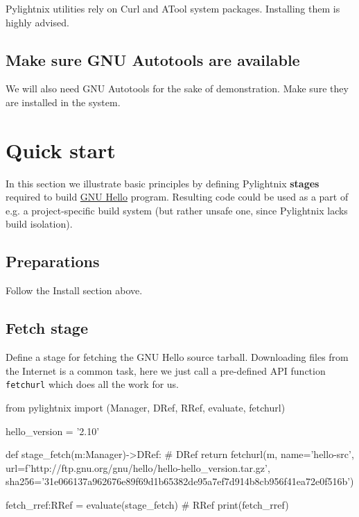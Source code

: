 \documentclass{article}
\begin{document}
Pylightnix utilities rely on Curl and ATool system packages. Installing them
is highly advised.


\subsection{Make sure GNU Autotools are available}

We will also need GNU Autotools for the sake of demonstration. Make sure they
are installed in the system.

\section{Quick start}

In this section we illustrate basic principles by defining Pylightnix
\textbf{stages} required to build \href{https://www.gnu.org/software/hello/}{GNU
Hello} program. Resulting code could be used as a part of e.g. a
project-specific build system (but rather unsafe one, since Pylightnix lacks
build isolation).

\subsection{Preparations}

Follow the Install section above.

\subsection{Fetch stage}

Define a stage for fetching the GNU Hello source tarball. Downloading files
from the Internet is a common task, here we just call a pre-defined API
function \texttt{fetchurl} which does all the work for us.

\begin{pythontexcode}
from pylightnix import (Manager, DRef, RRef, evaluate, fetchurl)

hello_version = '2.10'

def stage_fetch(m:Manager)->DRef: # DRef \label{DREF}
  return fetchurl(m,
    name='hello-src',
    url=f'http://ftp.gnu.org/gnu/hello/hello-{hello_version}.tar.gz',
    sha256='31e066137a962676e89f69d1b65382de95a7ef7d914b8cb956f41ea72e0f516b')

fetch_rref:RRef = evaluate(stage_fetch)  # RRef \label{RREF}
print(fetch_rref)
\end{pythontexcode}
\end{document}
